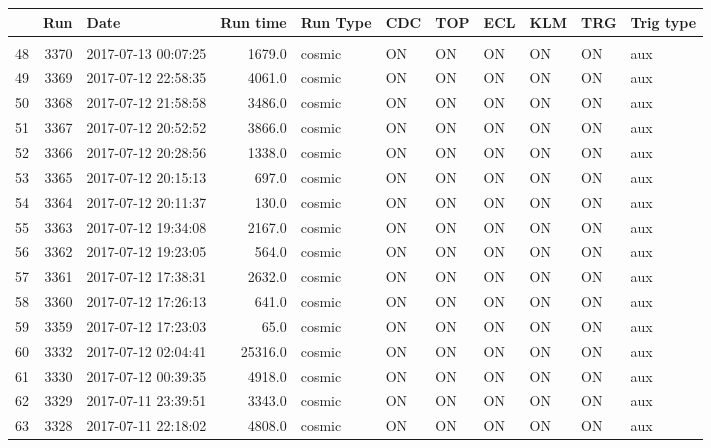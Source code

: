 \begin{longtable}{lrlrlllllll}
\toprule
{} &   Run &                 Date &  Run time & Run Type & CDC &  TOP &  ECL & KLM &  TRG & Trig type \\
\midrule                                                                                              \\
48  &  3370 &  2017-07-13 00:07:25 &    1679.0 &   cosmic &  ON &   ON &   ON &  ON &   ON &       aux\\
49  &  3369 &  2017-07-12 22:58:35 &    4061.0 &   cosmic &  ON &   ON &   ON &  ON &   ON &       aux\\
50  &  3368 &  2017-07-12 21:58:58 &    3486.0 &   cosmic &  ON &   ON &   ON &  ON &   ON &       aux\\
51  &  3367 &  2017-07-12 20:52:52 &    3866.0 &   cosmic &  ON &   ON &   ON &  ON &   ON &       aux\\
52  &  3366 &  2017-07-12 20:28:56 &    1338.0 &   cosmic &  ON &   ON &   ON &  ON &   ON &       aux\\
53  &  3365 &  2017-07-12 20:15:13 &     697.0 &   cosmic &  ON &   ON &   ON &  ON &   ON &       aux\\
54  &  3364 &  2017-07-12 20:11:37 &     130.0 &   cosmic &  ON &   ON &   ON &  ON &   ON &       aux\\
55  &  3363 &  2017-07-12 19:34:08 &    2167.0 &   cosmic &  ON &   ON &   ON &  ON &   ON &       aux\\
56  &  3362 &  2017-07-12 19:23:05 &     564.0 &   cosmic &  ON &   ON &   ON &  ON &   ON &       aux\\
57  &  3361 &  2017-07-12 17:38:31 &    2632.0 &   cosmic &  ON &   ON &   ON &  ON &   ON &       aux\\
58  &  3360 &  2017-07-12 17:26:13 &     641.0 &   cosmic &  ON &   ON &   ON &  ON &   ON &       aux\\
59  &  3359 &  2017-07-12 17:23:03 &      65.0 &   cosmic &  ON &   ON &   ON &  ON &   ON &       aux\\
60  &  3332 &  2017-07-12 02:04:41 &   25316.0 &   cosmic &  ON &   ON &   ON &  ON &   ON &       aux\\
61  &  3330 &  2017-07-12 00:39:35 &    4918.0 &   cosmic &  ON &   ON &   ON &  ON &   ON &       aux\\
62  &  3329 &  2017-07-11 23:39:51 &    3343.0 &   cosmic &  ON &   ON &   ON &  ON &   ON &       aux\\
63  &  3328 &  2017-07-11 22:18:02 &    4808.0 &   cosmic &  ON &   ON &   ON &  ON &   ON &       aux\\

\end{longtable}
